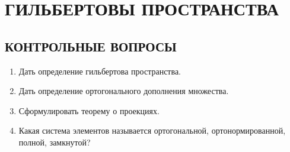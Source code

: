 \documentclass[12pt,a4paper]{article}
\begin{document}
\section{ГИЛЬБЕРТОВЫ ПРОСТРАНСТВА}

\subsection*{КОНТРОЛЬНЫЕ ВОПРОСЫ}
\begin{enumerate}
\item Дать определение гильбертова пространства.
\item Дать определение ортогонального дополнения множества.
\item Сформулировать теорему о проекциях.
\item Какая система элементов называется ортогональной, ортонормированной, полной, замкнутой?
\end{enumerate}
\end{document}
